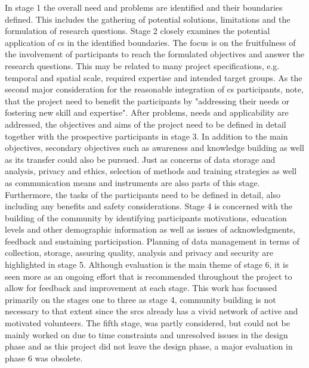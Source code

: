 
In stage 1 the overall need and problems are identified and their boundaries defined. This includes the gathering of potential solutions, limitations and the formulation of research questions. Stage 2 closely examines the potential application of \acrshort*{cs} in the identified boundaries. The focus is on the fruitfulness of the involvement of participants to reach the formulated objectives and answer the research questions. This may be related to many project specifications, e.g. temporal and spatial scale, required expertise and intended target groups. As the second major consideration for the reasonable integration of \acrshort*{cs} participants, \autocite[2]{fraislCitizenScienceEnvironmental2022} note, that the project need to benefit the participants by "addressing their needs or fostering new skill and expertise". After problems, needs and applicability are addressed, the objectives and aims of the project need to be defined in detail together with the prospective participants in stage 3. In addition to the main objectives, secondary objectives such as awareness and knowledge building as well as its transfer could also be pursued. Just as concerns of data storage and analysis, privacy and ethics, selection of methods and training strategies as well as communication means and instruments are also parts of this stage. Furthermore, the tasks of the participants need to be defined in detail, also including any benefits and safety considerations. Stage 4 is concerned with the building of the community by identifying participants motivations, education levels and other demographic information as well as issues of acknowledgments, feedback and sustaining participation. Planning of data management in terms of collection, storage, assuring quality, analysis and privacy and security are highlighted in stage 5. Although evaluation is the main theme of stage 6, it is seen more as an ongoing effort that is recommended throughout the project to allow for feedback and improvement at each stage.
This work has focussed primarily on the stages one to three as stage 4, community building is not necessary to that extent since the \acrshort*{srcs} already has a vivid network of active and motivated volunteers. The fifth stage, was partly considered, but could not be mainly worked on due to time constraints and unresolved issues in the design phase and as this project did not leave the design phase, a major evaluation in phase 6 was obsolete.

